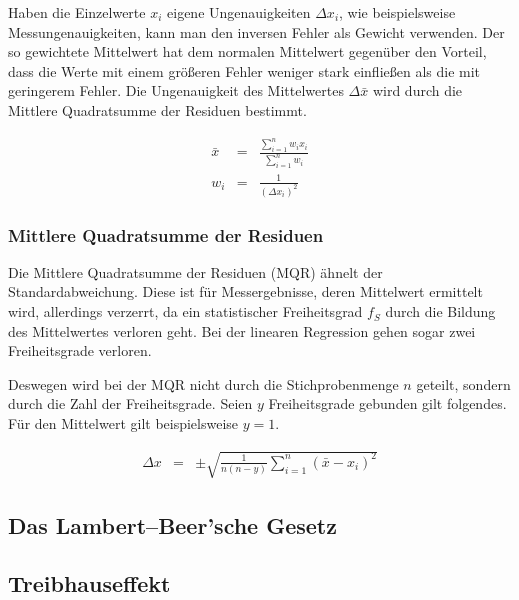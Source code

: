 \documentclass[12pt,a4paper]{scrartcl}
\numberwithin{equation}{section} %
\renewcommand{\[}{} %
\renewcommand{\]}{\noindent} %
\begin{document}
Haben die Einzelwerte \(x_i\) eigene Ungenauigkeiten \(\Delta x_i\), wie beispielsweise Messungenauigkeiten, kann man den inversen Fehler als Gewicht verwenden. Der so gewichtete Mittelwert hat dem normalen Mittelwert gegenüber den Vorteil, dass die Werte mit einem größeren Fehler weniger stark einfließen als die mit geringerem Fehler. Die Ungenauigkeit des Mittelwertes \(\Delta \bar x\) wird durch die Mittlere Quadratsumme der Residuen bestimmt.

\[
\begin{eqnarray}
    \bar{x} &=&
        \frac{\sum_{i=1}^n w_i x_i}{\sum_{i=1}^n w_i}\\
    w_i &=& \frac{1}{(\Delta x_i)^2}
\end{eqnarray}
\]

\hypertarget{mittlere-quadratsumme-der-residuen}{%
\subsubsection{Mittlere Quadratsumme der Residuen}\label{mittlere-quadratsumme-der-residuen}}

Die Mittlere Quadratsumme der Residuen (MQR) ähnelt der Standardabweichung. Diese ist für Messergebnisse, deren Mittelwert ermittelt wird, allerdings verzerrt, da ein statistischer Freiheitsgrad \(f_S\) durch die Bildung des Mittelwertes verloren geht. Bei der linearen Regression gehen sogar zwei Freiheitsgrade verloren.

Deswegen wird bei der MQR nicht durch die Stichprobenmenge \(n\) geteilt, sondern durch die Zahl der Freiheitsgrade. Seien \(y\) Freiheitsgrade gebunden gilt folgendes. Für den Mittelwert gilt beispielsweise \(y=1\).

\[
\begin{eqnarray}
    \Delta x &=& \pm\sqrt{\frac{1}{n(n - y)}\sum_{i=1}^n(\bar{x}-x_i)^2}
\end{eqnarray}
\]

\hypertarget{das-lambertbeersche-gesetz}{%
\subsection{Das Lambert--Beer'sche
Gesetz}\label{das-lambertbeersche-gesetz}}

\hypertarget{treibhauseffekt}{%
\subsection{Treibhauseffekt}\label{treibhauseffekt}}
\end{document}
